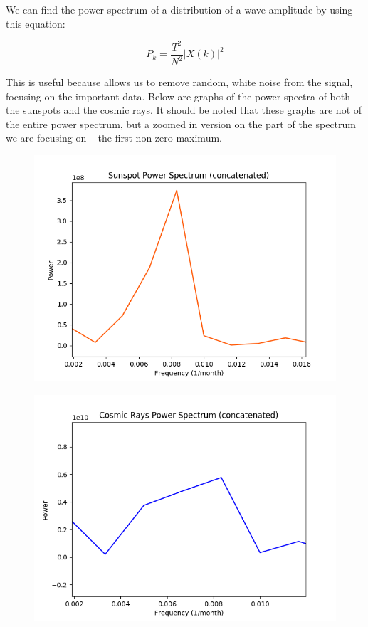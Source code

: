 \documentclass[12pt]{article}
\begin{document}
We can find the power spectrum of a distribution of a wave amplitude by using this equation:

\begin{equation}
P_k = \frac{T^2}{N^2} |X(k)|^2
\end{equation}

This is useful because allows us to remove random, white noise from the signal, focusing on the important data. Below are graphs of the power spectra of both the sunspots and the cosmic rays. It should be noted that these graphs are not of the entire power spectrum, but a zoomed in version on the part of the spectrum we are focusing on -- the first non-zero maximum.

\begin{figure}[H]
\begin{center}
\includegraphics[scale=0.8]{psd_ss.png}
\end{center}
\end{figure}


\begin{figure}[H]
\begin{center}
\includegraphics[scale=0.8]{psd_rays.png}
\end{center}
\end{figure}
\end{document}
